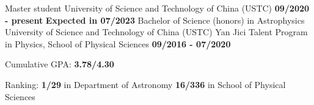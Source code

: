 
\begin{cventries}
  \cventry
    {\textnormal{Master student }}
    {University of Science and Technology of China (USTC)}
    {\textcolor{awesome-emerald}{\textbf{09/2020 - present}}}
    {\textcolor{awesome-emerald}{\textbf{Expected in 07/2023}}}
    {}
  \cventry
    {\textnormal{Bachelor of Science (honors) in Astrophysics}} 
    {University of Science and Technology of China (USTC)\newline
    \textnormal{Yan Jici Talent Program in Physics, School of Physical Sciences}} 
    {\textcolor{awesome-emerald}{\textbf{09/2016 - 07/2020}}}
    {\textcolor{awesome-emerald}{\textbf{}}}
    {
      \begin{cvitems} %
         \item{\textnormal{Cumulative GPA:} \textbf{3.78/4.30}}
         \item{\textnormal{Ranking:} \textbf{1/29} \textnormal{in Department of Astronomy}
         \newline
         \hspace{1.3cm}\textbf{16/336} \textnormal{in School of Physical Sciences}}
      \end{cvitems}
    }
  \vspace{-0.4cm}
\end{cventries}
